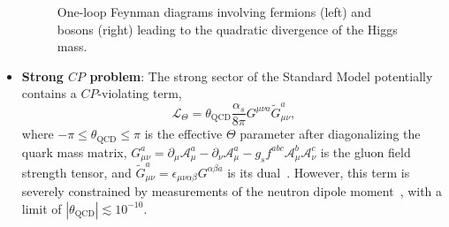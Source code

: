 \begin{itemize}
	\begin{figure}[htbp]
		\centering
		\hfill
		\hfill
		\hfill
		\caption{One-loop Feynman diagrams involving fermions (left) and bosons (right) leading to the quadratic divergence of the Higgs mass.}
		\label{fig:higgs-mass-feyman-diagrams}
	\end{figure}
	

	\item \textbf{Strong $CP$ problem}: The strong sector of the Standard Model potentially contains a $CP$-violating term, 
	\begin{equation}
		\mathcal{L}_{\Theta}=\theta_{\mathrm{QCD}} \frac{\alpha_s}{8\pi}G^{\mu \nu a} \tilde{G}^{a}_{\mu\nu},
	\end{equation}
	where $-\pi\leq\theta_{\mathrm{QCD}}\leq\pi$ is the effective $\Theta$ parameter after diagonalizing the quark mass matrix, $G^{a}_{\mu\nu}=\partial_{\mu}\mathcal{A}_{\mu}^{a}-\partial_{\nu}\mathcal{A}_{\mu}^{a} - g_s f^{abc}\mathcal{A}_{\mu}^{b} \mathcal{A}_{\nu}^{c}$ is the gluon field strength tensor, and $\tilde{G}^a_{\mu\nu}=\epsilon_{\mu\nu\alpha\beta}G^{\alpha\beta a}$ is its dual~\cite{pdg-axions}. However, this term is severely constrained by measurements of the neutron dipole moment~\cite{PhysRevLett.97.131801}, with a limit of $|\theta_{\mathrm{QCD}}|\lesssim 10^{-10}$. 


\end{itemize}
